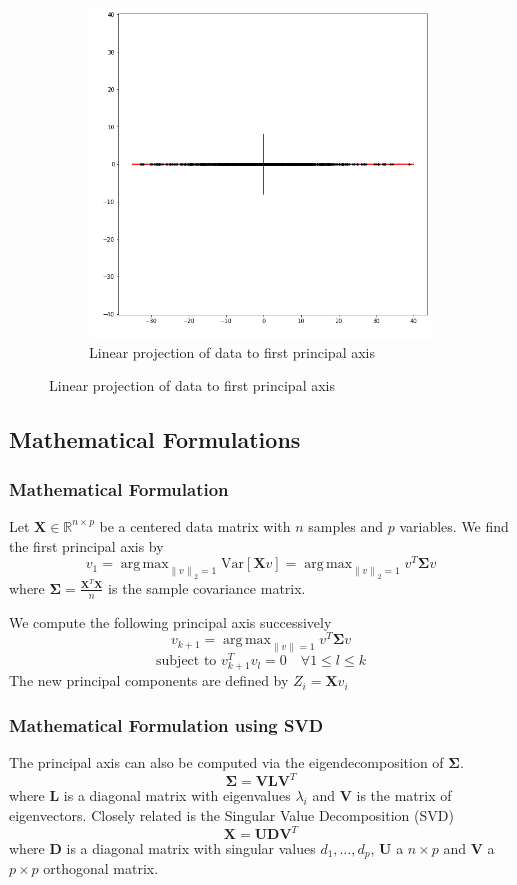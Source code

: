 \documentclass{beamer}
\theoremstyle{plain}
\theoremstyle{definition}
\newcommand{\mat}[1]{\mathbf{#1}}
\DeclareMathOperator*{\argmax}{arg\,max}
\newcommand{\norm}[1]{\left\lVert #1 \right\rVert}
\begin{document}
\begin{frame}
\begin{figure}
\begin{subfigure}{0.45\textwidth}
	\includegraphics[width = \textwidth]{figures/pca_example_rotated.png}
	\caption{Linear projection of data to first principal axis}
	\end{subfigure}
\end{figure}
\end{frame}

\subsection{Mathematical Formulations}
\begin{frame}
\frametitle{Mathematical Formulation}
Let $\mat X \in \mathbb{R}^{n \times p}$ be a centered data matrix with $n$ samples and $p$ variables. We find the first principal axis by 
$$v_1 = \argmax_{\norm{v}_2 = 1} \text{Var}[\mat{X}v] = \argmax_{\norm{v}_2 = 1} v^T \mat{\Sigma} v$$
where $\mat{\Sigma} = \frac{\mat X^T \mat X}{n}$ is the sample covariance matrix.\pause

We compute the following principal axis successively
$$v_{k+1} = \argmax_{\norm{v} = 1} v^T \mat{\Sigma} v$$ 
$$\text{subject to }v_{k+1}^Tv_l = 0 \quad \forall 1 \leq l \leq k$$\pause
The new principal components are defined by $Z_i = \mat{X}v_i$
\end{frame}

\begin{frame}
\frametitle{Mathematical Formulation using SVD}
The principal axis can also be computed via the eigendecomposition of $\mat{\Sigma}$.
$$\mat{\Sigma} = \mat V \mat L \mat{V}^T$$
where $\mat{L}$ is a diagonal matrix with eigenvalues $\lambda_i$ and $\mat V$ is the matrix of eigenvectors.\linebreak \pause
Closely related is the Singular Value Decomposition (SVD) 
$$ \mat{X} = \mat{U}\mat{D}\mat{V}^T $$
where $\mat{D}$ is a diagonal matrix with singular values $d_1,\ldots,d_p$, $\mat{U}$ a $n \times p$ and $\mat{V}$ a $p \times p$ orthogonal matrix.
\end{frame}
\end{document}

